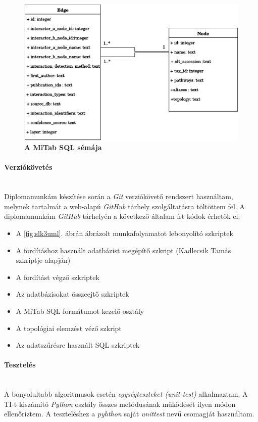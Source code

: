 \documentclass[a4paper,12pt]{article}
\begin{document}
				\begin{figure}[H]
					 \includegraphics[scale=0.7]{img/Mitab-SQL.pdf}
			 		 \centering
			 		 \caption{ \textbf{A MiTab SQL sémája} }
			 		 \label{fig:mitab_scheme}			 		 
				\end{figure}
				
			\paragraph{Verziókövetés} \mbox{}\\
			Diplomamunkám készítése során a \textit{Git} verziókövető rendszert használtam, melynek tartalmát a web-alapú \textit{GitHub} tárhely szolgáltatásra töltöttem fel. A diplomamunkám \textit{GitHub} tárhelyén \cite{github} a következő általam írt kódok érhetők el: 
				\begin{itemize}
						\item A \ref{fig:slk3uml}. ábrán ábrázolt munkafolyamatot lebonyolító szkriptek
						\item A fordításhoz használt adatbázist megépítő szkript (Kadlecsik Tamás szkriptje alapján)
						\item A fordítást végző szkriptek
						\item Az adatbázisokat összeejtő szkriptek
						\item A MiTab SQL formátumot kezelő osztály
						\item A topológiai elemzést véző szkript
						\item Az adatszűrésre használt SQL szkriptek
				\end{itemize}
				
			\paragraph{Tesztelés} \mbox{}\\
			A bonyolultabb algoritmusok esetén \textit{egységteszteket (unit test)} alkalmaztam. A TI-t kiszámító \textit{Python} osztály összes metódusának működését ilyen módon ellenőriztem. A teszteléshez a \textit{pyhthon} saját \textit{unittest} nevű csomagját használtam.
				
\end{document}
